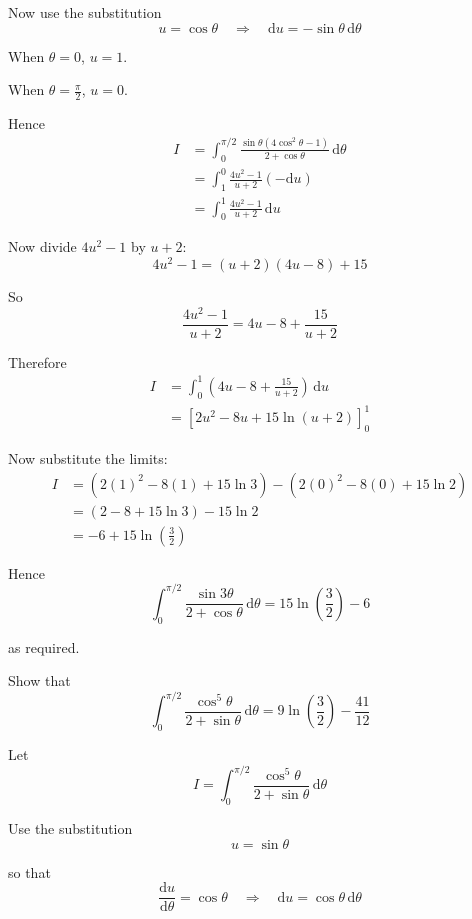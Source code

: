 \documentclass[leqno]{article}
\begin{document}
\begin{enumerate}[
  label=\textbf{\arabic*.},
  leftmargin=*,
  topsep=0pt,
  partopsep=0pt,
  parsep=0pt
]
\begin{djsSolution}
Now use the substitution
\[
u=\cos\theta
\quad\Longrightarrow\quad
\mathrm{d}u=-\sin\theta\,\mathrm{d}\theta
\]

When $\theta=0$, $u=1$.

When $\theta=\frac{\pi}{2}$, $u=0$.

Hence
\begin{align*}
I
&=\int_0^{\pi/2}\frac{\sin\theta(4\cos^2\theta-1)}{2+\cos\theta}\,\mathrm{d}\theta\\
&=\int_1^0\frac{4u^2-1}{u+2}(-\mathrm{d}u)\\
&=\int_0^1\frac{4u^2-1}{u+2}\,\mathrm{d}u
\end{align*}

Now divide $4u^2-1$ by $u+2$:
\[
4u^2-1=(u+2)(4u-8)+15
\]

So
\[
\frac{4u^2-1}{u+2}=4u-8+\frac{15}{u+2}
\]

Therefore
\begin{align*}
I
&=\int_0^1\left(4u-8+\frac{15}{u+2}\right)\,\mathrm{d}u\\
&=\left[2u^2-8u+15\ln(u+2)\right]_0^1
\end{align*}

Now substitute the limits:
\begin{align*}
I
&=\left(2(1)^2-8(1)+15\ln 3\right)-\left(2(0)^2-8(0)+15\ln 2\right)\\
&=(2-8+15\ln 3)-15\ln 2\\
&=-6+15\ln\left(\frac{3}{2}\right)
\end{align*}

Hence
\[
\int_0^{\pi/2}\frac{\sin 3\theta}{2+\cos\theta}\,\mathrm{d}\theta
=15\ln\left(\frac{3}{2}\right)-6
\]

as required.
\end{djsSolution}


\newpage

\questionitem

Show that
\[
\int_0^{\pi/2} \frac{\cos^5 \theta}{2 + \sin \theta}\,\mathrm{d}\theta = 9\ln\left(\frac{3}{2}\right) - \frac{41}{12}
\]

\vspace*{10pt}

\begin{djsSolution}
Let
\[
I=\int_0^{\pi/2}\frac{\cos^5\theta}{2+\sin\theta}\,\mathrm{d}\theta
\]

Use the substitution
\[
u=\sin\theta
\]

so that
\[
\frac{\mathrm{d}u}{\mathrm{d}\theta}=\cos\theta
\quad\Longrightarrow\quad
\mathrm{d}u=\cos\theta\,\mathrm{d}\theta
\]


\end{djsSolution}
\end{enumerate}
\end{document}
